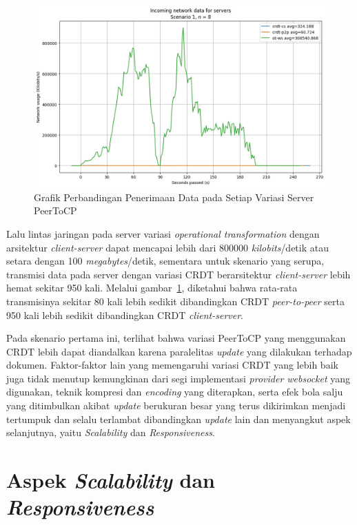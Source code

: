 \begin{figure}
 \centering
 \includegraphics[width=15cm]{./assets/skripsi/benchmark-vis_cell_2_output_24}
 \caption{Grafik Perbandingan Penerimaan Data pada Setiap Variasi Server PeerToCP}
 \label{fig:2-24}
\end{figure}

Lalu lintas jaringan pada server variasi \textit{operational transformation} dengan arsitektur \textit{client-server} dapat mencapai lebih dari 800000 \textit{kilobits}/detik atau setara dengan 100 \textit{megabytes}/detik, sementara untuk skenario yang serupa, transmisi data pada server dengan variasi CRDT berarsitektur \textit{client-server} lebih hemat sekitar 950 kali. Melalui gambar~\ref{fig:2-24}, diketahui bahwa rata-rata transmisinya sekitar 80 kali lebih sedikit dibandingkan CRDT \textit{peer-to-peer} serta 950 kali lebih sedikit dibandingkan CRDT \textit{client-server}.

Pada skenario pertama ini, terlihat bahwa variasi PeerToCP yang menggunakan CRDT lebih dapat diandalkan karena paralelitas \textit{update} yang dilakukan terhadap dokumen. Faktor-faktor lain yang memengaruhi variasi CRDT yang lebih baik juga tidak menutup kemungkinan dari segi implementasi \textit{provider websocket} yang digunakan, teknik kompresi dan \textit{encoding} yang diterapkan, serta efek bola salju yang ditimbulkan akibat \textit{update} berukuran besar yang terus dikirimkan menjadi tertumpuk dan selalu terlambat dibandingkan \textit{update} lain dan menyangkut aspek selanjutnya, yaitu \textit{Scalability} dan \textit{Responsiveness}.

\section{Aspek \textit{Scalability} dan \textit{Responsiveness}}

